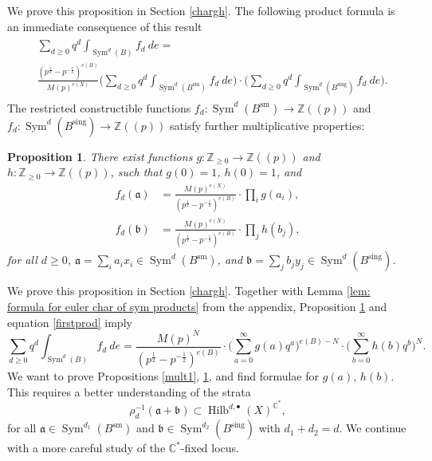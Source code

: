 \documentclass{amsart}
\newtheorem{proposition}[theorem]{Proposition}
\theoremstyle{definition}
\newcommand{\CC} {\mathbb{C}}          %
\newcommand{\ZZ} {\mathbb{Z}}		%
\newcommand{\Sym}{\operatorname{Sym}}
\newcommand{\Hilb}{\operatorname{Hilb}}
\newcommand{\sm}{\operatorname{sm}}
\newcommand{\sing}{\operatorname{sing}}
\begin{document}
We prove this proposition in Section \ref{chargh}. The following product formula is an immediate consequence of this result
\begin{align}
\begin{split} \label{firstprod}
&\sum_{d \geq 0} q^d \int_{\Sym^d(B)} f_d \ de = \\
&\frac{(p^{\frac{1}{2}} - p^{-\frac{1}{2}})^{e(B)}}{M(p)^{e(X)}}  \Big( \sum_{d \geq 0} q^d \int_{\Sym^d(B^{\sm})} f_d \ de \Big) \cdot \Big( \sum_{d \geq 0} q^d \int_{\Sym^d(B^{\sing})} f_d \ de \Big). 
\end{split}
\end{align}
The restricted constructible functions $f_d  : \Sym^d(B^{\sm}) \rightarrow \ZZ(\!(p)\!)$ and $f_d  : \Sym^d(B^{\sing}) \rightarrow \ZZ(\!(p)\!)$ satisfy further multiplicative properties:
\begin{proposition} \label{mult2}
There exist functions $g : \ZZ_{\geq 0} \rightarrow \ZZ(\!(p)\!)$ and $h : \ZZ_{\geq 0} \rightarrow \ZZ(\!(p)\!)$, such that $g(0)=1$, $h(0)=1$, and
\begin{align*}
f_{d}(\mathfrak{a}) &= \frac{M(p)^{e(X)}}{(p^{\frac{1}{2}} - p^{-\frac{1}{2}})^{e(B)}} \cdot \prod_{i} g(a_i), \\
f_{d}(\mathfrak{b}) &= \frac{M(p)^{e(X)}}{(p^{\frac{1}{2}} - p^{-\frac{1}{2}})^{e(B)}} \cdot \prod_{j} h(b_j), 
\end{align*}
for all $d \geq 0$, $\mathfrak{a} = \sum_i a_i x_i \in \Sym^{d}(B^{\sm})$, and $\mathfrak{b} = \sum_j b_j y_j \in \Sym^{d}(B^{\sing})$.
\end{proposition}
We prove this proposition in Section \ref{chargh}. Together with Lemma \ref{lem: formula for euler char of sym products} from the appendix, Proposition \ref{mult2} and equation \eqref{firstprod} imply
\begin{equation} \label{initialprod}
\sum_{d \geq 0} q^d \int_{\Sym^d(B)} f_d \ de = \frac{M(p)^{N}}{(p^{\frac{1}{2}} - p^{-\frac{1}{2}})^{e(B)}} \cdot \Big( \sum_{a=0}^{\infty} g(a) q^a \Big)^{e(B) - N} \cdot \Big( \sum_{b=0}^{\infty} h(b) q^b \Big)^N.
\end{equation}
We want to prove Propositions \ref{mult1}, \ref{mult2}, and find formulae for $g(a)$, $h(b)$. This requires a better understanding of the strata
$$
\rho_{d}^{-1} (\mathfrak{a} + \mathfrak{b}) \subset \Hilb^{d, \bullet}(X)^{\CC^*},
$$
for all $\mathfrak{a} \in \Sym^{d_1}(B^{\sm})$ and $\mathfrak{b} \in \Sym^{d_2}(B^{\sing})$ with $d_1+d_2=d$. We continue with a more careful study of the $\CC^*$-fixed locus.
\end{document}
